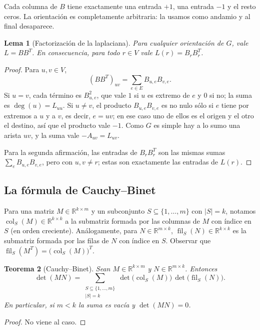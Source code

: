 \documentclass[12pt,a4paper]{article}
\theoremstyle{profesional}
\newtheorem{teorema}{Teorema}[subsection]
\newtheorem{lemma}[teorema]{Lema}
\theoremstyle{definicion-style}
\theoremstyle{observacion-style}
\newcommand{\R}{\mathbb{R}}
\newcommand{\abs}[1]{\left| #1 \right|}
\newcommand{\colS}[2]{\operatorname{col}_{#2}(#1)}
\newcommand{\filS}[2]{\operatorname{fil}_{#2}(#1)}
\begin{document}
Cada columna de \( B \) tiene exactamente una entrada \( +1 \), una entrada \( -1 \) y el resto ceros. La orientación es completamente arbitraria: la usamos como andamio y al final desaparece.

\begin{lemma}[Factorización de la laplaciana]\label{lema:LBBt}
    Para cualquier orientación de \( G \), vale \( L = B B^{T} \). En consecuencia, para todo \( r \in V \) vale \( L(r) = B_r B_r^{T} \).
\end{lemma}
\begin{proof}
    Para \( u, v \in V \),
    \[
        {(B B^{T})}_{uv} = \sum_{e \in E} B_{u,e} B_{v,e}.
    \]
    Si \( u = v \), cada término es \( B_{u,e}^2 \), que vale \( 1 \) si \( u \) es extremo de \( e \) y \( 0 \) si no; la suma es \( \deg(u) = L_{uu} \). Si \( u \neq v \), el producto \( B_{u,e} B_{v,e} \) es no nulo sólo si \( e \) tiene por extremos a \( u \) y a \( v \), es decir, \( e = uv \); en ese caso uno de ellos es el origen y el otro el destino, así que el producto vale \( -1 \). Como \( G \) es simple hay a lo sumo una arista \( uv \), y la suma vale \( -A_{uv} = L_{uv} \).

    Para la segunda afirmación, las entradas de \( B_r B_r^{T} \) son las mismas sumas \( \sum_{e} B_{u,e}B_{v,e} \), pero con \( u, v \neq r \); estas son exactamente las entradas de \( L(r) \).
\end{proof}

\subsection{La fórmula de Cauchy--Binet}

Para una matriz \( M \in \R^{k \times m} \) y un subconjunto \( S \subseteq \{1, \ldots, m\} \) con \( \abs{S} = k \), notamos \( \colS{M}{S} \in \R^{k \times k} \) a la submatriz formada por las columnas de \( M \) con índice en \( S \) (en orden creciente).
Análogamente, para \( N \in \R^{m \times k} \), \( \filS{N}{S} \in \R^{k \times k} \) es la submatriz formada por las filas de \( N \) con índice en \( S \). Observar que \( \filS{M^{T}}{S} = {\big( \colS{M}{S} \big)}^{T} \).

\begin{teorema}[Cauchy--Binet]\label{teo:cb}
    Sean \( M \in \R^{k \times m} \) y \( N \in \R^{m \times k} \). Entonces
    \[
        \det(M N) = \sum_{\substack{S \subseteq \{1,\ldots,m\} \\ \abs{S} = k}} \det\big( \colS{M}{S} \big) \, \det\big( \filS{N}{S} \big).
    \]
    En particular, si \( m < k \) la suma es vacía y \( \det(MN) = 0 \).
\end{teorema}
\begin{proof}
    No viene al caso.
\end{proof}
\end{document}

